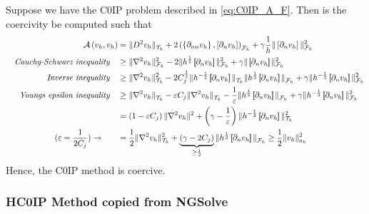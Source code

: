 Suppose we have the C0IP problem described in \eqref{eq:C0IP_A_F}. Then is the coercivity be computed such that
\[
    \begin{split}
\mathcal{A} \left( v_{h}, v_{h} \right) & = \| D^2v_{h} \|_{ \mathcal{T} _{h} }^{  }  + 2 \left( \left\{ \partial _{nn} v_{h} \right\} , \left[ \partial _{n}v_{h} \right]  \right) _{\mathcal{F} _{h}} + \gamma \frac{1}{h} \| \left[ \partial _{n} v_{h}
\right]  \|_{ \mathcal{F} _{h} }^{ 2 } \\
\quad \textit{Cauchy-Schwarz inequality} \quad
& \ge \| \nabla ^2 v_{h} \|_{ \mathcal{F} _{h} }^{2  } -2 \| h^{\frac{1}{2}} \jump{ \partial _{n}v_{h} }    \|_{  \mathcal{F} _{h}}^{  2} + \gamma \|  \jump{ \partial _{n}v_{h} }   \|_{ \mathcal{F} _{h}  }^{ 2 } \\
\quad \textit{Inverse inequality} \quad
 &  \ge  \| \nabla ^2 v_{h}  \|_{ \mathcal{T} _{h}  }^{ 2  } - 2 C^{\frac{1}{2}}_{j} \| h^{-\frac{1}{2}} \jump{ \partial _{n} v_{h} }   \|_{ \mathcal{T} _{h}  }^{  } \| h^{\frac{1}{2}} \jump{ \partial _{n} v_{h} }   \|_{ \mathcal{F} _{h} }^{  }  + \gamma \| h^{ -\frac{1}{2}} \jump{
 \partial _{n } v_{h}}   \|_{ \mathcal{F}_{h}}^{2}  \\
\quad \textit{ Youngs epsilon inequality} \quad
  &  \ge  \| \nabla ^2 v_{h} \|_{ \mathcal{T}_{h}  }^{  } - \varepsilon C_{j} \| \nabla ^2 v_{h} \|_{ \mathcal{T} _{h} }^{  } - \frac{1}{\varepsilon } \| h^{\frac{1}{2}} \jump{ \partial _{n} v_{h} }   \|_{ \mathcal{F} _{h} }^{  }  + \gamma \|
  h^{-\frac{1}{2}} \jump{ \partial _{n} v_{h}}   \|_{ \mathcal{F} _{h} }^{2  }  \\
  & =  \left( 1 - \varepsilon C_{j} \right) \| \nabla ^2 v_{h} \|_{  }^{ 2 } + \left( \gamma  - \frac{1}{\varepsilon } \right) \| h^{-\frac{1}{2}} \jump{ \partial _{n} v_{h} }   \|_{ \mathcal{T} _{h} }^{ 2 } \\
  (\varepsilon  = \frac{1}{2 C_{j} }) \to  \quad \quad &= \frac{1}{2} \| \nabla ^2 v_{h} \|_{ \mathcal{T} _{h} }^{ 2 }  + \underbrace{\left( \gamma -2 C_{j} \right)}_{ \ge  \frac{1}{2}}  \| h^{\frac{1}{2}} \jump{ \partial _{n} v_{h} }   \|_{
  \mathcal{F} _{h} }^{  } \ge \frac{1}{2} \| v_{h} \|_{ a_{h} }^{  2}    \\
    \end{split}
\]
Hence, the C0IP method is coercive.
\subsubsection{HC0IP Method copied from NGSolve}%
\label{ssub:hc0ip_method_from_ngsolve}

